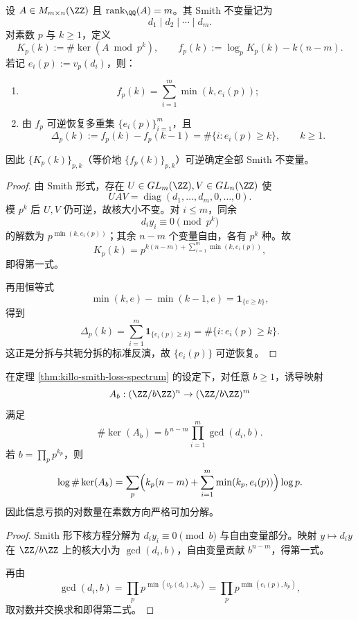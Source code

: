 \begin{theorem}\label{thm:killo-smith-loss-spectrum}
设 \(A\in M_{m\times n}(\ZZ)\) 且 \(\operatorname{rank}_{\QQ}(A)=m\)。其 Smith 不变量记为
\[
d_1\mid d_2\mid\cdots\mid d_m.
\]
对素数 \(p\) 与 \(k\ge 1\)，定义
\[
K_p(k):=\#\ker(A\bmod p^k),\qquad
f_p(k):=\log_p K_p(k)-k(n-m).
\]
若记 \(e_i(p):=v_p(d_i)\)，则：
\begin{enumerate}
\item
\[
f_p(k)=\sum_{i=1}^m\min(k,e_i(p));
\]
\item 由 \(f_p\) 可逆恢复多重集 \(\{e_i(p)\}_{i=1}^m\)，且
\[
\Delta_p(k):=f_p(k)-f_p(k-1)=\#\{i:e_i(p)\ge k\},\qquad k\ge 1.
\]
\end{enumerate}
因此 \(\{K_p(k)\}_{p,k}\)（等价地 \(\{f_p(k)\}_{p,k}\)）可逆确定全部 Smith 不变量。
\end{theorem}
\begin{proof}
由 Smith 形式，存在 \(U\in GL_m(\ZZ),V\in GL_n(\ZZ)\) 使
\[
UAV=\operatorname{diag}(d_1,\dots,d_m,0,\dots,0).
\]
模 \(p^k\) 后 \(U,V\) 仍可逆，故核大小不变。对 \(i\le m\)，同余
\[
d_i y_i\equiv 0\pmod{p^k}
\]
的解数为 \(p^{\min(k,e_i(p))}\)；其余 \(n-m\) 个变量自由，各有 \(p^k\) 种。故
\[
K_p(k)=p^{k(n-m)+\sum_{i=1}^m\min(k,e_i(p))},
\]
即得第一式。

再用恒等式
\[
\min(k,e)-\min(k-1,e)=\mathbf 1_{\{e\ge k\}},
\]
得到
\[
\Delta_p(k)=\sum_{i=1}^m\mathbf 1_{\{e_i(p)\ge k\}}=\#\{i:e_i(p)\ge k\}.
\]
这正是分拆与共轭分拆的标准反演，故 \(\{e_i(p)\}\) 可逆恢复。
\end{proof}

\begin{corollary}[任意模数下的信息亏损闭式与素数可加分解]\label{cor:killo-kernel-size-general-modulus}
在定理 \ref{thm:killo-smith-loss-spectrum} 的设定下，对任意 \(b\ge 1\)，诱导映射
\[
A_b:(\ZZ/b\ZZ)^n\to(\ZZ/b\ZZ)^m
\]
满足
\[
\#\ker(A_b)=b^{\,n-m}\prod_{i=1}^m\gcd(d_i,b).
\]
若 \(b=\prod_p p^{k_p}\)，则
\[
\log \#\ker(A_b)
=\sum_{p}\Bigl(k_p(n-m)+\sum_{i=1}^m\min(k_p,e_i(p))\Bigr)\log p.
\]
因此信息亏损的对数量在素数方向严格可加分解。
\end{corollary}
\begin{proof}
Smith 形下核方程分解为 \(d_i y_i\equiv 0\pmod b\) 与自由变量部分。映射 \(y\mapsto d_i y\) 在 \(\ZZ/b\ZZ\) 上的核大小为 \(\gcd(d_i,b)\)，自由变量贡献 \(b^{n-m}\)，得第一式。

再由
\[
\gcd(d_i,b)=\prod_p p^{\min(v_p(d_i),k_p)}
=\prod_p p^{\min(e_i(p),k_p)},
\]
取对数并交换求和即得第二式。
\end{proof}

